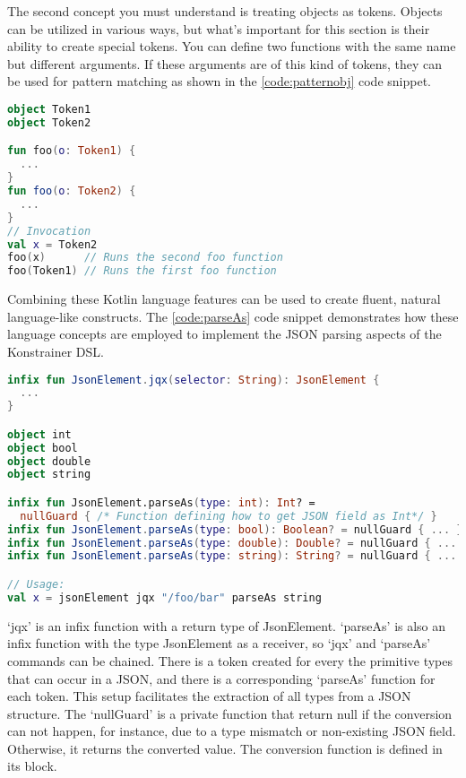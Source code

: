 The second concept you must understand is treating objects as tokens. Objects can be utilized in various ways, but what's important for this section is their ability to create special tokens. You can define two functions with the same name but different arguments. If these arguments are of this kind of tokens, they can be used for pattern matching as shown in the \ref{code:patternobj} code snippet.

\begin{minipage}{\linewidth}
\begin{lstlisting}[caption={Pattern matching},language=Kotlin,label=code:patternobj]
object Token1
object Token2

fun foo(o: Token1) {
  ...
}
fun foo(o: Token2) {
  ...
}
// Invocation
val x = Token2
foo(x)      // Runs the second foo function
foo(Token1) // Runs the first foo function
\end{lstlisting}
\end{minipage}

Combining these Kotlin language features can be used to create fluent, natural language-like constructs. The \ref{code:parseAs} code snippet demonstrates how these language concepts are employed to implement the JSON parsing aspects of the Konstrainer DSL.

\begin{minipage}{\linewidth}
\begin{lstlisting}[caption={JSON parsing implementation},language=Kotlin,label=code:parseAs]
infix fun JsonElement.jqx(selector: String): JsonElement {
  ...
}

object int
object bool
object double
object string

infix fun JsonElement.parseAs(type: int): Int? = 
  nullGuard { /* Function defining how to get JSON field as Int*/ }
infix fun JsonElement.parseAs(type: bool): Boolean? = nullGuard { ... }
infix fun JsonElement.parseAs(type: double): Double? = nullGuard { ... }
infix fun JsonElement.parseAs(type: string): String? = nullGuard { ... }

// Usage:
val x = jsonElement jqx "/foo/bar" parseAs string
\end{lstlisting}
\end{minipage}

`jqx' is an infix function with a return type of JsonElement. `parseAs' is also an infix function with the type JsonElement as a receiver, so `jqx' and `parseAs' commands can be chained. There is a token created for every the primitive types that can occur in a JSON, and there is a corresponding `parseAs' function for each token. This setup facilitates the extraction of all types from a JSON structure. The `nullGuard' is a private function that return null if the conversion can not happen, for instance, due to a type mismatch or non-existing JSON field. Otherwise, it returns the converted value. The conversion function is defined in its block.
